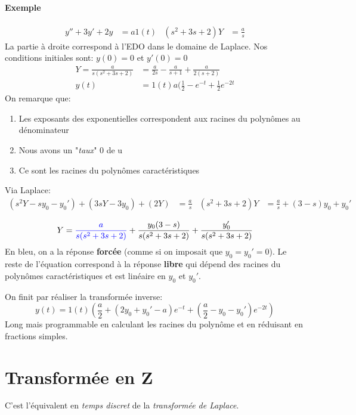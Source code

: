 \documentclass{report}
\begin{document}
\subsubsection{Exemple}
\begin{align*}
y'' + 3y' + 2y &= a1(t) & (s^2 + 3 s + 2)Y &= \frac{a}{s}
\end{align*}
La partie à droite correspond à l'EDO dans le domaine de Laplace. Nos conditions initiales sont: $y(0) = 0$ et $y'(0) = 0$
\begin{align*}
Y = \frac{a}{s(s^2 + 3s +2)} &= \frac{a}{2s} - \frac{a}{s+1} + \frac{a}{2(s+2)}\\
y(t) &= 1(t) a (\frac{1}{2} - e^{-t} + \frac{1}{2} e^{-2t}
\end{align*}
On remarque que:
\begin{enumerate}
\item Les exposants des exponentielles correspondent aux racines du polynômes au dénominateur
\item Nous avons un "\textit{taux}" 0 de u
\item Ce sont les racines du polynômes caractéristiques
\end{enumerate}
Via Laplace:
\begin{align*}
(s^2 Y - sy_0 -y_0') + (3 sY -3 y_0) + (2Y) &= \frac{a}{s} & (s^2 + 3s + 2)Y &= \frac{a}{s} + (3-s) y_0 + y_0'\\
\end{align*}
\begin{equation}
Y = \textcolor{blue}{\frac{a}{s(s^2 + 3s + 2)}} + \frac{y_0 (3-s)}{s(s^2 + 3s + 2)} + \frac{y_0'}{s(s^2 + 3s +2)}
\end{equation}
En bleu, on a la réponse \textbf{forcée} (comme si on imposait que $y_0 = y_0' = 0$). Le reste de l'équation correspond à la réponse \textbf{libre} qui dépend des racines du polynômes caractéristiques et est linéaire en $y_0$ et $y_0'$.\par
On finit par réaliser la transformée inverse:
\begin{equation}
y(t) = 1(t) (\frac{a}{2} + (2 y_0 + y_0' -a ) e^{-t} + (\frac{a}{2} -y_0 -y_0') e^{-2t})
\end{equation}
Long mais programmable en calculant les racines du polynôme et en réduisant en fractions simples.


\chapter{Transformée en Z}
C'est l'équivalent en \textit{temps discret} de la \textit{transformée de Laplace}.
\end{document}
